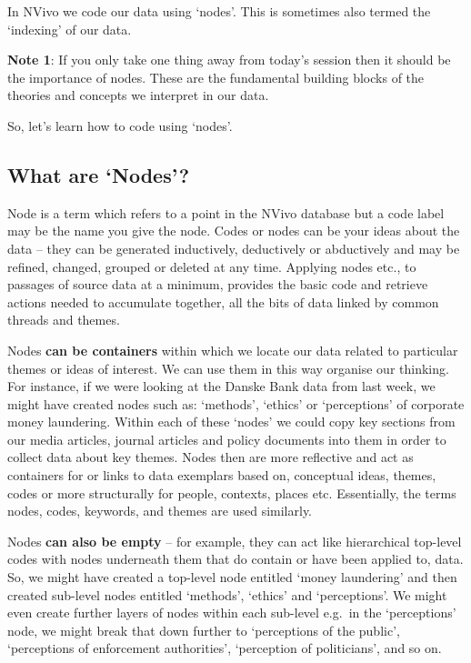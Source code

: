 \documentclass[
]{book}
\begin{document}
In NVivo we code our data using `nodes'. This is sometimes also termed the `indexing' of our data.

\textbf{Note 1}: If you only take one thing away from today's session then it should be the importance of nodes. These are the fundamental building blocks of the theories and concepts we interpret in our data.

So, let's learn how to code using `nodes'.

\hypertarget{what-are-nodes}{%
\subsection{What are `Nodes'?}\label{what-are-nodes}}

Node is a term which refers to a point in the NVivo database but a code label may be the name you give the node. Codes or nodes can be your ideas about the data -- they can be generated inductively, deductively or abductively and may be refined, changed, grouped or deleted at any time. Applying nodes etc., to passages of source data at a minimum, provides the basic code and retrieve actions needed to accumulate together, all the bits of data linked by common threads and themes.

Nodes \textbf{can be containers} within which we locate our data related to particular themes or ideas of interest. We can use them in this way organise our thinking. For instance, if we were looking at the Danske Bank data from last week, we might have created nodes such as: `methods', `ethics' or `perceptions' of corporate money laundering. Within each of these `nodes' we could copy key sections from our media articles, journal articles and policy documents into them in order to collect data about key themes. Nodes then are more reflective and act as containers for or links to data exemplars based on, conceptual ideas, themes, codes or more structurally for people, contexts, places etc. Essentially, the terms nodes, codes, keywords, and themes are used similarly.

Nodes \textbf{can also be empty} -- for example, they can act like hierarchical top-level codes with nodes underneath them that do contain or have been applied to, data. So, we might have created a top-level node entitled `money laundering' and then created sub-level nodes entitled `methods', `ethics' and `perceptions'. We might even create further layers of nodes within each sub-level e.g.~in the `perceptions' node, we might break that down further to `perceptions of the public', `perceptions of enforcement authorities', `perception of politicians', and so on.
\end{document}
